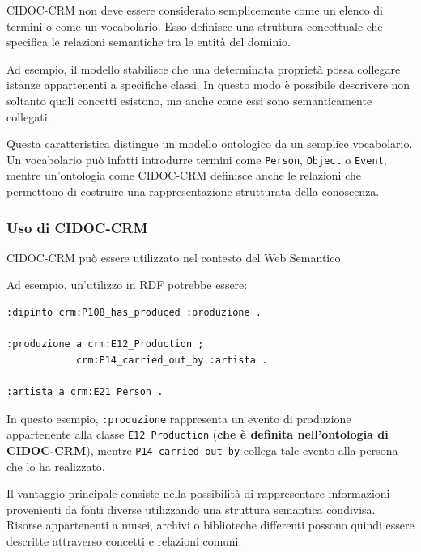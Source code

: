 CIDOC-CRM non deve essere considerato semplicemente come un elenco di
termini o come un vocabolario. Esso definisce una struttura concettuale
che specifica le relazioni semantiche tra le entità del dominio.

Ad esempio, il modello stabilisce che una determinata proprietà possa
collegare istanze appartenenti a specifiche classi. In questo modo è
possibile descrivere non soltanto quali concetti esistono, ma anche come
essi sono semanticamente collegati.

Questa caratteristica distingue un modello ontologico da un semplice
vocabolario. Un vocabolario può infatti introdurre termini come
\texttt{Person}, \texttt{Object} o \texttt{Event}, mentre un'ontologia
come CIDOC-CRM definisce anche le relazioni che permettono di costruire
una rappresentazione strutturata della conoscenza.

\subsubsection{Uso di CIDOC-CRM}

CIDOC-CRM può essere utilizzato nel contesto del Web Semantico

Ad esempio, un'utilizzo in RDF potrebbe essere:

\begin{verbatim}
:dipinto crm:P108_has_produced :produzione .

:produzione a crm:E12_Production ;
            crm:P14_carried_out_by :artista .

:artista a crm:E21_Person .
\end{verbatim}

In questo esempio, \texttt{:produzione} rappresenta un evento di
produzione appartenente alla classe \texttt{E12 Production} (\textbf{che è definita nell'ontologia di CIDOC-CRM}), mentre
\texttt{P14 carried out by} collega tale evento alla persona che lo ha
realizzato.

Il vantaggio principale consiste nella possibilità di rappresentare
informazioni provenienti da fonti diverse utilizzando una struttura
semantica condivisa. Risorse appartenenti a musei, archivi o
biblioteche differenti possono quindi essere descritte attraverso
concetti e relazioni comuni.
